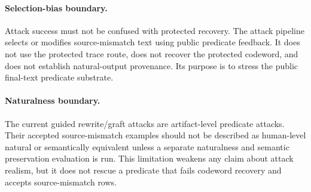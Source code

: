 \paragraph{Selection-bias boundary.}
Attack success must not be confused with protected recovery.  The attack
pipeline selects or modifies source-mismatch text using public predicate
feedback.  It does not use the protected trace route, does not recover the
protected codeword, and does not establish natural-output provenance.  Its
purpose is to stress the public final-text predicate substrate.

\paragraph{Naturalness boundary.}
The current guided rewrite/graft attacks are artifact-level predicate attacks.
Their accepted source-mismatch examples should not be described as human-level
natural or semantically equivalent unless a separate naturalness and semantic
preservation evaluation is run.  This limitation weakens any claim about
attack realism, but it does not rescue a predicate that fails codeword recovery
and accepts source-mismatch rows.
